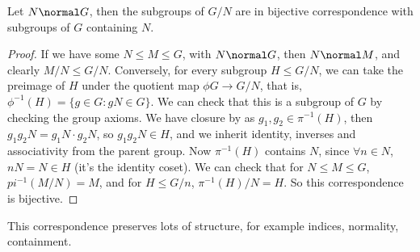 \documentclass[a4paper]{scrartcl}
\begin{document}
\begin{theorem}
	Let $N \normal G$, then the subgroups of $G/N$ are in bijective correspondence with subgroups of $G$ containing $N$.
\end{theorem}
\begin{proof}
	If we have some $N \leq M \leq G$, with $N \normal G$, then $N \normal M$, and clearly $M/N \leq G/N$. Conversely, for every subgroup $H \leq G/N$, we can take the preimage of $H$ under the quotient map $\phi G \rightarrow G/N$, that is, $\phi^{-1}(H) = \{ g \in G : gN \in G \}$. We can check that this is a subgroup of $G$ by checking the group axioms.
	We have closure by as $g_1, g_2 \in \pi^{-1}(H)$, then $g_1 g_2 N = g_1 N \cdot g_2 N$, so $g_1 g_2 N \in H$, and we inherit identity, inverses and associativity from the parent group.
	Now $\pi^{-1}(H)$ contains $N$, since $\forall n \in N$, $nN = N \in H$ (it's the identity coset).
	We can check that for $N \leq M \leq G$, $pi^{-1}(M/N) = M$, and for $H \leq G/n$, $\pi^{-1}(H) / N = H$. So this correspondence is bijective.
\end{proof}

This correspondence preserves lots of structure, for example indices, normality, containment.
\end{document}
